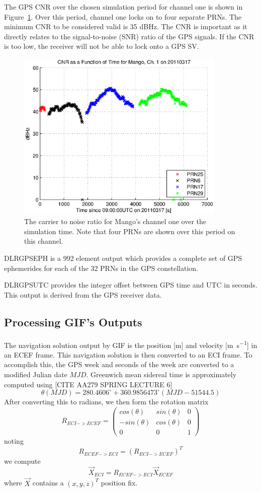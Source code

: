 \documentclass{article}
\begin{document}
The GPS CNR over the chosen simulation period for channel one is shown in Figure~\ref{fig:CNR}. Over this period, channel one locks on to four separate PRNs. The minimum CNR to be considered valid is 35 \si{dBHz}. The CNR is important as it directly relates to the signal-to-noise (SNR) ratio of the GPS signals. If the CNR is too low, the receiver will not be able to lock onto a GPS SV.

\begin{figure}[H]
    \centering
    \includegraphics[width=10cm]{CNR.eps}
    \caption{The carrier to noise ratio for Mango's channel one over the simulation time. Note that four PRNs are shown over this period on this channel.}
    \label{fig:CNR}
\end{figure}

DLR\textunderscore GPS\textunderscore EPH is a 992 element output which provides a complete set of GPS ephemerides for each of the 32 PRNs in the GPS constellation.

DLR\textunderscore GPS\textunderscore UTC provides the integer offset between GPS time and UTC in seconds. This output is derived from the GPS receiver data.

\subsection{Processing GIF's Outputs}
The navigation solution output by GIF is the position [\si{\meter}] and velocity [\si{\meter\per\second}] in an ECEF frame. This navigation solution is then converted to an ECI frame. To accomplish this, the GPS week and seconds of the week are converted to a modified Julian date $MJD$. Greenwich mean sidereal time is approximately computed using [CITE AA279 SPRING LECTURE 6]
\[\theta(MJD) = 280.4606^{\circ} + 360.9856473^{\circ}(MJD-51544.5) \]
After converting this to radians, we then form the rotation matrix 
\[R_{ECI->ECEF} = \begin{pmatrix}
    cos(\theta) & sin(\theta) & 0\\
    -sin(\theta) & cos(\theta) & 0\\
    0 & 0 & 1
  \end{pmatrix} \]
noting
\[ R_{ECEF->ECI} = (R_{ECI->ECEF})^T \]
we compute 
\[ \vec{X}_{ECI} = R_{ECEF->ECI}\vec{X}_{ECEF} \]
where $\vec{X}$ contains a $(x,y,z)^T$ position fix.
\end{document}
